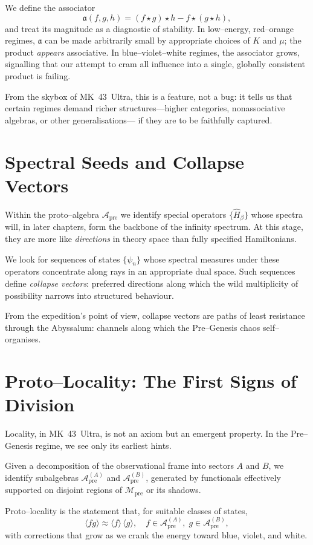 We define the associator
\[
\mathfrak{a}(f,g,h)
= (f \star g)\star h - f \star (g \star h),
\]
and treat its magnitude as a diagnostic of stability. In low–energy, red–orange regimes,
$\mathfrak{a}$ can be made arbitrarily small by appropriate choices of $K$ and $\mu$; the product
\emph{appears} associative. In blue–violet–white regimes, the associator grows, signalling that
our attempt to cram all influence into a single, globally consistent product is failing.

From the skybox of MK~43~Ultra, this is a feature, not a bug: it tells us that certain regimes
demand richer structures—higher categories, nonassociative algebras, or other generalisations—
if they are to be faithfully captured.

\section{Spectral Seeds and Collapse Vectors}
Within the proto–algebra $\mathcal{A}_\mathrm{pre}$ we identify special operators
$\{\hat{H}_\beta\}$ whose spectra will, in later chapters, form the backbone of the infinity
spectrum. At this stage, they are more like \emph{directions} in theory space than fully
specified Hamiltonians.

We look for sequences of states $\{\psi_n\}$ whose spectral measures under these operators
concentrate along rays in an appropriate dual space. Such sequences define \emph{collapse
vectors}: preferred directions along which the wild multiplicity of possibility narrows into
structured behaviour.

From the expedition’s point of view, collapse vectors are paths of least resistance through the
Abyssalum: channels along which the Pre–Genesis chaos self–organises.

\section{Proto–Locality: The First Signs of Division}
Locality, in MK~43~Ultra, is not an axiom but an emergent property. In the Pre–Genesis regime,
we see only its earliest hints.

Given a decomposition of the observational frame into sectors $A$ and $B$, we identify subalgebras
$\mathcal{A}_\mathrm{pre}^{(A)}$ and $\mathcal{A}_\mathrm{pre}^{(B)}$, generated by functionals
effectively supported on disjoint regions of $\mathcal{M}_\mathrm{pre}$ or its shadows.

Proto–locality is the statement that, for suitable classes of states,
\[
\langle fg \rangle \approx \langle f \rangle\,\langle g \rangle,
\quad
f \in \mathcal{A}_\mathrm{pre}^{(A)},\;
g \in \mathcal{A}_\mathrm{pre}^{(B)},
\]
with corrections that grow as we crank the energy toward blue, violet, and white.

